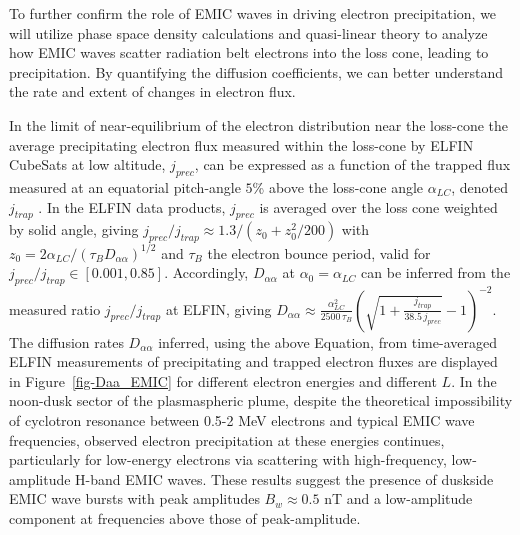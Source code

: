 \documentclass[
  letterpaper,
  DIV=11,
  numbers=noendperiod]{scrartcl}
\begin{document}
To further confirm the role of EMIC waves in driving electron precipitation, we will utilize phase space density calculations and quasi-linear theory to analyze how EMIC waves scatter radiation belt electrons into the loss cone, leading to precipitation. By quantifying the diffusion coefficients, we can better understand the rate and extent of changes in electron flux.

In the limit of near-equilibrium of the electron distribution near the loss-cone \citep{kennelLimitStablyTrapped1966} the average precipitating electron flux measured within the loss-cone by ELFIN CubeSats at low altitude, \(j_{prec}\), can be expressed as a function of the trapped flux measured at an equatorial pitch-angle \(5\)\% above the loss-cone angle \(\alpha_{LC}\), denoted \(j_{trap}\) \citep{mourenasUpperLimitOuter2023}. In the ELFIN data products, \(j_{prec}\) is averaged over the loss cone weighted by solid angle, giving \(j_{prec}/j_{trap}\approx 1.3/(z_0+z_0^2/200)\) with \(z_0=2\alpha_{LC}/(\tau_B D_{\alpha\alpha})^{1/2}\) and \(\tau_B\) the electron bounce period, valid for \(j_{prec}/j_{trap}\in[0.001,0.85]\).
Accordingly, \(D_{\alpha\alpha}\) at \(\alpha_0=\alpha_{LC}\) can be inferred from the measured ratio \(j_{prec}/j_{trap}\) at ELFIN, giving \(D_{\alpha\alpha} \approx \frac{{\alpha_{LC}^2}}{{2500\, \tau_B }} \left(\sqrt{1+ \frac{{ j_{trap} }}{{ 38.5\, j_{prec} }} } -1 \right)^{-2}\).
The diffusion rates \(D_{\alpha\alpha}\) inferred, using the above Equation, from time-averaged ELFIN measurements of precipitating and trapped electron fluxes are displayed in Figure~\ref{fig-Daa_EMIC} for different electron energies and different \(L\). In the noon-dusk sector of the plasmaspheric plume, despite the theoretical impossibility of cyclotron resonance between 0.5-2 MeV electrons and typical EMIC wave frequencies, observed electron precipitation at these energies continues, particularly for low-energy electrons via scattering with high-frequency, low-amplitude H-band EMIC waves.
These results suggest the presence of duskside EMIC wave bursts with peak amplitudes \(B_w\approx 0.5\) nT and a low-amplitude component at frequencies above those of peak-amplitude.
\end{document}
